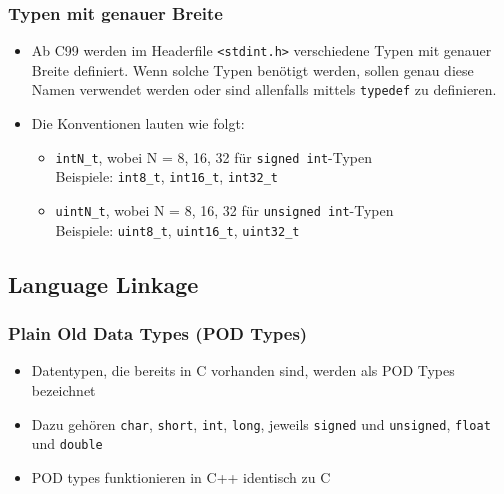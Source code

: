 \subsubsection{Typen mit genauer Breite}
\begin{itemize}
	\item Ab C99 werden im Headerfile \lstinline{<stdint.h>} verschiedene Typen mit genauer Breite definiert. Wenn solche Typen benötigt werden, sollen genau diese Namen verwendet werden oder sind allenfalls mittels \lstinline{typedef} zu definieren.
	\item Die Konventionen lauten wie folgt:
	\begin{itemize}
		\item \lstinline{intN_t}, wobei N = 8, 16, 32 für \lstinline{signed int}-Typen \\
		Beispiele: \lstinline{int8_t}, \lstinline{int16_t}, \lstinline{int32_t}
		\item \lstinline{uintN_t}, wobei N = 8, 16, 32 für \lstinline{unsigned int}-Typen \\
		Beispiele: \lstinline{uint8_t}, \lstinline{uint16_t}, \lstinline{uint32_t}
	\end{itemize}
\end{itemize}

\subsection{Language Linkage}
\subsubsection{Plain Old Data Types (POD Types)}
\begin{itemize}
	\item Datentypen, die bereits in C vorhanden sind, werden als POD Types bezeichnet
	\item Dazu gehören \lstinline{char}, \lstinline{short}, \lstinline{int}, \lstinline{long}, jeweils \lstinline{signed} und \lstinline{unsigned}, \lstinline{float} und \lstinline{double}
	\item POD types funktionieren in C++ identisch zu C
\end{itemize}

